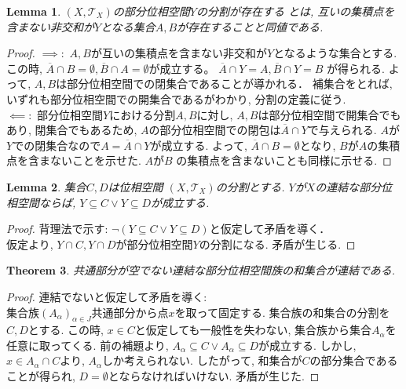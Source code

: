 \documentclass[dvipdfmx]{jbook}
\newcommand{\cl}[1]{\overline{ #1}  }
\newtheorem{theorem}{Theorem}[section]
\newtheorem{lemma}[theorem]{Lemma}
\theoremstyle{remark}
\theoremstyle{plain}
\begin{document}
\begin{lemma}
$(X, \mathcal{T}_X)$の部分位相空間$Y$の分割が存在する
とは, 互いの集積点を含まない非交和が$Y$となる集合$A,B$が存在することと同値である.
\end{lemma}

\begin{proof}
	$\implies:$ $A,B$が互いの集積点を含まない非交和が$Y$となるような集合とする. 
	この時, $ \cl{A} \cap B = \emptyset, \cl{B} \cap A = \emptyset$が成立する。
	$\cl{A} \cap Y = A, \cl{B} \cap Y = B$ が得られる.
	よって, $A,B$は部分位相空間での閉集合であることが導かれる．
	補集合をとれば, いずれも部分位相空間での開集合であるがわかり, 分割の定義に従う.\\
	$\impliedby:$ 部分位相空間$Y$における分割$A,B$に対し, $A,B$は部分位相空間で開集合でもあり, 
	閉集合でもあるため, $A$の部分位相空間での閉包は$\cl{A} \cap Y$で与えられる. 
	$A$が$Y$での閉集合なので$A = \cl{A} \cap Y$が成立する. 
	よって, $\cl{A} \cap B = \emptyset$となり, $B$が$A$の集積点を含まないことを示せた. 
	$A$が$B$ の集積点を含まないことも同様に示せる.
\end{proof}

\begin{lemma}
	集合$C,D$は位相空間 $(X,\mathcal{T}_X)$の分割とする. $Y$が$X$の連結な部分位相空間ならば, $Y \subseteq C \lor Y \subseteq D$が成立する.
\end{lemma}
 
\begin{proof}
	背理法で示す: $ \lnot (Y \subseteq C \lor Y \subseteq D)$と仮定して矛盾を導く．\\
	仮定より, $Y \cap C, Y\cap D$が部分位相空間$Y$の分割になる. 矛盾が生じる.
\end{proof}

\begin{theorem}
	共通部分が空でない連結な部分位相空間族の和集合が連結である.
\end{theorem}

\begin{proof}
	連結でないと仮定して矛盾を導く:\\
	集合族$\left( A_{\alpha} \right) _{\alpha \in J}$共通部分から点$x$を取って固定する.
	集合族の和集合の分割を$C,D$とする.
	この時, $x \in C$と仮定しても一般性を失わない, 集合族から集合$A_{\alpha}$を任意に取ってくる.
	前の補題より, $A_{\alpha} \subseteq C \lor A_{\alpha} \subseteq D$が成立する. 
	しかし, $x \in A_{\alpha} \cap C$より, $A_{\alpha}$しか考えられない. 
	したがって, 和集合が$C$の部分集合であることが得られ, $D = \emptyset$とならなければいけない. 
	矛盾が生じた.
\end{proof}
\end{document}
